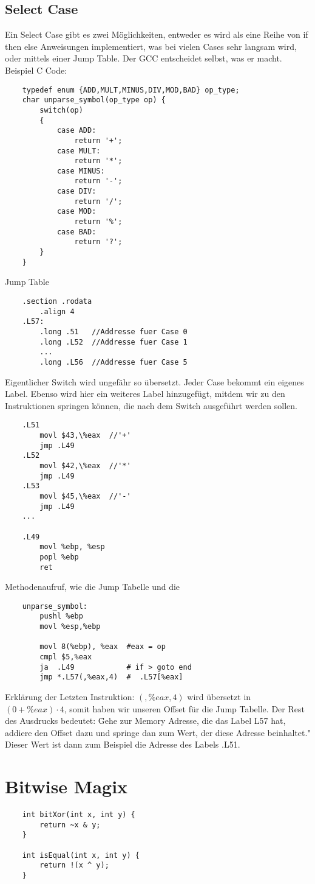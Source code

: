 \documentclass[a4paper, 11pt]{article}
\begin{document}
\subsection{Select Case}
Ein Select Case gibt es zwei Möglichkeiten, entweder es wird als eine Reihe von if then else Anweisungen implementiert, was bei vielen Cases sehr langsam wird, oder mittels einer Jump Table. Der GCC entscheidet selbst, was er macht.\\
Beispiel C Code:
\begin{lstlisting}
	typedef enum {ADD,MULT,MINUS,DIV,MOD,BAD} op_type;
	char unparse_symbol(op_type op) {
		switch(op)
		{
			case ADD:
				return '+';
			case MULT:
				return '*';
			case MINUS:
				return '-';
			case DIV:
				return '/';
			case MOD:
				return '%';
			case BAD:
				return '?';
		}
	}
\end{lstlisting}
Jump Table
\begin{lstlisting}
	.section .rodata
		.align 4
	.L57:
		.long .51	//Addresse fuer Case 0
		.long .L52	//Addresse fuer Case 1
		...
		.long .L56  //Addresse fuer Case 5
\end{lstlisting}
Eigentlicher Switch wird ungefähr so übersetzt. Jeder Case bekommt ein eigenes Label. Ebenso wird hier ein weiteres Label hinzugefügt, mitdem wir zu den Instruktionen springen können, die nach dem Switch ausgeführt werden sollen.
\begin{lstlisting}
	.L51
		movl $43,\%eax  //'+'
		jmp .L49
	.L52
		movl $42,\%eax  //'*'
		jmp .L49
	.L53
		movl $45,\%eax  //'-'
		jmp .L49
	...
	
	.L49
		movl %ebp, %esp
		popl %ebp
		ret
\end{lstlisting}
Methodenaufruf, wie die Jump Tabelle und die
\begin{lstlisting}
	unparse_symbol:
		pushl %ebp
		movl %esp,%ebp
		
		movl 8(%ebp), %eax  #eax = op
		cmpl $5,%eax 		
		ja	.L49			# if > goto end
		jmp *.L57(,%eax,4)	#  .L57[%eax]
\end{lstlisting}
Erklärung der Letzten Instruktion:
$(,\%eax,4)$ wird übersetzt in $(0+ \%eax)\cdot4$, somit haben wir unseren Offset für die Jump Tabelle. Der Rest des Ausdrucks bedeutet: \"Gehe zur Memory Adresse, die das Label L57 hat, addiere den Offset dazu und springe dan zum Wert, der diese Adresse beinhaltet." Dieser Wert ist dann zum Beispiel die Adresse des Labels .L51.
\section{Bitwise Magix}
\begin{lstlisting}
	int bitXor(int x, int y) {
		return ~x & y;
	}
	
	int isEqual(int x, int y) {
		return !(x ^ y);
	}
\end{lstlisting}
\end{document}
